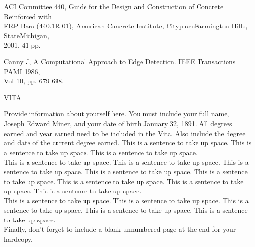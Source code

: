 \documentclass{article}
\newcommand{\tab}{\hspace{5mm}}
\begin{document}
ACI Committee 440, Guide for the Design and Construction of Concrete 
Reinforced with \\
\tab FRP Bars (440.1R-01), American Concrete Institute, CityplaceFarmington 
Hills, StateMichigan, \\
\tab 2001, 41 pp.

Canny J, A Computational Approach to Edge Detection. IEEE Transactions 
PAMI 1986, \\
\tab Vol 10, pp. 679-698.


\newpage

\begin{center}
VITA


\end{center}

Provide information about yourself here. You must include your 
full name, Joseph Edward Miner, and your date of birth January 
32, 1891. All degrees earned and year earned need to be included 
in the Vita. Also include the degree and date of the current 
degree earned. This is a sentence to take up space. This is a 
sentence to take up space. This is a sentence to take up space.\\
This is a sentence to take up space. This is a sentence to take 
up space. This is a sentence to take up space. This is a sentence 
to take up space. This is a sentence to take up space. This is 
a sentence to take up space. This is a sentence to take up space. 
This is a sentence to take up space.\\
This is a sentence to take up space. This is a sentence to take 
up space. This is a sentence to take up space. This is a sentence 
to take up space. This is a sentence to take up space.\\
Finally, don't forget to include a blank unnumbered page at the 
end for your hardcopy.
\end{document}
